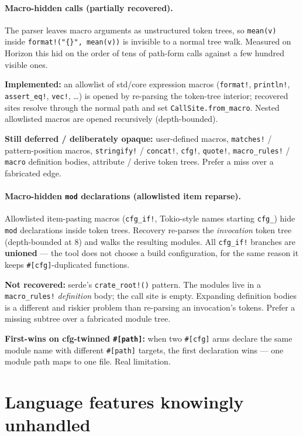 \documentclass[11pt,a4paper]{article}
\begin{document}
\paragraph{Macro-hidden calls (partially recovered).}
 The parser leaves macro
arguments as unstructured token trees, so \verb|mean(v)| inside
\verb|format!("{}", mean(v))| is invisible to a normal tree walk. Measured on
Horizon this hid on the order of tens of path-form calls against a few hundred
visible ones.

\textbf{Implemented:} an allowlist of std/core expression macros
(\verb|format!|, \verb|println!|, \verb|assert_eq!|, \verb|vec!|, \ldots) is
opened by re-parsing the token-tree interior; recovered sites resolve through
the normal path and set \verb|CallSite.from_macro|. Nested allowlisted macros
are opened recursively (depth-bounded).

\textbf{Still deferred / deliberately opaque:} user-defined macros,
\verb|matches!| / pattern-position macros, \verb|stringify!| / \verb|concat!|,
\verb|cfg!|, \verb|quote!|, \verb|macro_rules!| / \verb|macro| definition
bodies, attribute / derive token trees. Prefer a miss over a fabricated edge.

\paragraph{Macro-hidden \texttt{mod} declarations (allowlisted item reparse).}
 Allowlisted item-pasting macros (\verb|cfg_if!|, Tokio-style names starting
\verb|cfg_|) hide \verb|mod| declarations inside token trees. Recovery
re-parses the \emph{invocation} token tree (depth-bounded at 8) and walks the
resulting modules. All \verb|cfg_if!| branches are \textbf{unioned} --- the tool
does not choose a build configuration, for the same reason it keeps
\verb|#[cfg]|-duplicated functions.

\textbf{Not recovered:} serde's \verb|crate_root!()| pattern. The modules live
in a \verb|macro_rules!| \emph{definition} body; the call site is empty.
Expanding definition bodies is a different and riskier problem than re-parsing
an invocation's tokens. Prefer a missing subtree over a fabricated module tree.

\textbf{First-wins on cfg-twinned \texttt{\#[path]}:} when two \verb|#[cfg]| arms
declare the same module name with different \verb|#[path]| targets, the first
declaration wins --- one module path maps to one file. Real limitation.

\section{Language features knowingly unhandled}
\end{document}
